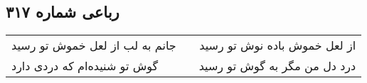 \begin{center}
\section*{رباعی شماره ۳۱۷}
\label{sec:sh317}
\begin{longtable}{l p{0.5cm} r}
جانم به لب از لعل خموش تو رسید
&&
از لعل خموش باده نوش تو رسید
\\
گوش تو شنیده‌ام که دردی دارد
&&
درد دل من مگر به گوش تو رسید
\\
\end{longtable}
\end{center}
